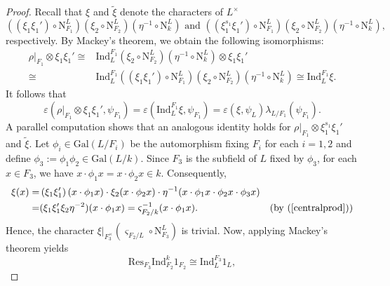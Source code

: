 \documentclass[12pt]{amsart}
\newcommand{\Gal}{{\mathrm{Gal}}}
\newcommand{\Ind}{{\mathrm{Ind}}}
\theoremstyle{Theorem}
\theoremstyle{Theorem}
\theoremstyle{Theorem}
\theoremstyle{Theorem}
\theoremstyle{Plain}
\theoremstyle{remark}
\theoremstyle{remark}
\theoremstyle{Definition}
\begin{document}
\begin{proof}
    Recall that $\xi$ and $\widetilde{\xi}$ denote the characters of $L^\times$
    \[
        \left( \left( \xi_1 \xi_1' \right) \circ \mathrm{N}^L_{ F_1 } \right) \left( \xi_2 \circ \mathrm{N}^L_{ F_2 } \right) \left( \eta^{-1} \circ \mathrm{N}^L_k \right) \text{ and } \left( \left( \xi_1^{ s_1 } \xi_1' \right) \circ \mathrm{N}^L_{ F_1 } \right) \left( \xi_2 \circ \mathrm{N}^L_{F_2} \right) \left( \eta^{-1} \circ \mathrm{N}^L_k \right),
    \]
    respectively. By Mackey's theorem, we obtain the following isomorphisms:
    \[
        \begin{aligned}
            \rho|_{ F_1 } \otimes \xi_1 \xi_1'
            \cong& \mathrm{Ind}^{ F_1 }_{L} \left( \xi_2 \circ \mathrm{N}^L_{ F_2 } \right) \left( \eta^{-1} \circ \mathrm{N}^L_{k} \right) \otimes \xi_1 \xi_1'\\
            \cong& \Ind^{ F_1 }_L \left( \left( \xi_1 \xi_1' \right) \circ \mathrm{N}^L_{ F_1 } \right) \left( \xi_2 \circ \mathrm{N}^L_{ F_2 } \right) \left( \eta^{-1} \circ \mathrm{N}^L_{k} \right) \cong \Ind^{ F_1 }_{L} \xi.
        \end{aligned}
    \]
    It follows that
    \[
        \varepsilon \left( \rho|_{ F_1 } \otimes \xi_1 \xi_1', \psi_{ F_1 } \right) = \varepsilon \left( \Ind^{ F_1 }_{L} \xi, \psi_{ F_1 } \right) = \varepsilon \left( \xi, \psi_L \right) \lambda_{ L/F_1 } \left( \psi_{ F_1 } \right).
    \]
    A parallel computation shows that an analogous identity holds for $ \rho|_{ F_1 } \otimes \xi_1^{ s_1 } \xi_1' $ and $ \widetilde{ \xi } $. Let $ \phi_i \in \Gal( L/F_i ) $ be the automorphism fixing $F_i$ for each $ i = 1, 2 $ and define $ \phi_3 := \phi_1 \phi_2 \in \Gal( L/k ) $. Since $F_3$ is the subfield of $L$ fixed by $\phi_3$, for each $ x \in F_3 $, we have $ x \cdot \phi_1 x = x \cdot \phi_2 x \in k $. Consequently,
    \[
        \begin{aligned}
            \xi (x) =& \left( \xi_1 \xi_1' \right) (x \cdot \phi_1 x ) \cdot \xi_2 ( x \cdot \phi_2 x ) \cdot \eta^{-1} ( x \cdot \phi_1 x \cdot \phi_2 x \cdot \phi_3 x )\\
                    =& ( \xi_1 \xi_1' \xi_2 \eta^{-2} ) ( x \cdot \phi_1 x ) = \varsigma_{ F_2/k }^{-1} ( x \cdot \phi_1 x ). & (\text{by } ( \ref{centralprod} ) )
        \end{aligned}
    \]
    Hence, the character $ \xi|_{ F_3^\times } \left( \varsigma_{ F_2/L } \circ \mathrm{N}^{L}_{ F_3 } \right) $ is trivial. Now, applying Mackey's theorem yields   
    \[
        \mathrm{Res}_{ F_3 } \mathrm{Ind}^k_{ F_2 } 1_{ F_2 } \cong \mathrm{Ind}_{L}^{ F_3 } 1_L,
\]
\end{proof}
\end{document}
